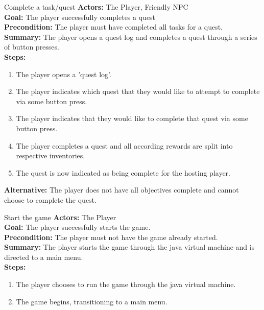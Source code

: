 \documentclass[12pt]{report}
\begin{document}
\begin{subsection}{Complete a task/quest}
\textbf{Actors:} The Player, Friendly NPC \\
\textbf{Goal:} The player successfully completes a quest \\
\textbf{Precondition:} The player must have completed all tasks for a quest. \\
\textbf{Summary:} The player opens a quest log and completes a quest through a series of button presses. \\
\textbf{Steps:}
\begin{enumerate}
	\item The player opens a 'quest log'.
	\item The player indicates which quest that they would like to attempt to complete via some button press.
	\item The player indicates that they would like to complete that quest via some button press.
	\item The player completes a quest and all according rewards are split into  respective inventories.
	\item The quest is now indicated as being complete for the hosting player.
\end{enumerate}
\textbf{Alternative:} The player does not have all objectives complete and cannot choose to complete the quest.
\end{subsection}

\begin{subsection}{Start the game}
\textbf{Actors:} The Player \\
\textbf{Goal:} The player successfully starts the game. \\
\textbf{Precondition:} The player must not have the game already started. \\
\textbf{Summary:} The player starts the game through the java virtual machine and is directed to a main menu. \\
\textbf{Steps:}
\begin{enumerate}
	\item The player chooses to run the game through the java virtual machine.
	\item The game begins, transitioning to a main menu.
\end{enumerate}
\end{subsection}
\end{document}
